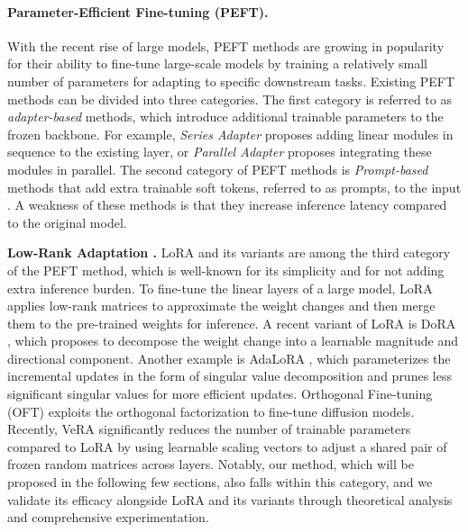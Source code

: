 \paragraph{Parameter-Efficient Fine-tuning (PEFT).} With the recent rise of large models, PEFT methods are growing in popularity for their ability to fine-tune large-scale models by training a relatively small number of parameters for adapting to specific downstream tasks. Existing PEFT methods can be divided into three categories. The first category is referred to as \textit{adapter-based} methods, which introduce additional trainable parameters to the frozen backbone. For example, \textit{Series Adapter} \cite{houlsby2019parameter} proposes adding linear modules in sequence to the existing layer, or \textit{Parallel Adapter} \cite{parallel-adapter} proposes integrating these modules in parallel. The second category of PEFT methods is \textit{Prompt-based} methods that add extra trainable soft tokens, referred to as prompts, to the input \cite{lester2021powerscaleparameterefficientprompt, razdaibiedina2023residualprompttuningimproving, wang2023nonintrusiveadaptationinputcentricparameterefficient}. A weakness of these methods is that they increase inference latency compared to the original model. 

\textbf{Low-Rank Adaptation \cite{lora}.}
LoRA and its variants are among the third category of the PEFT method, which is well-known for its simplicity and for not adding extra inference burden. To fine-tune the linear layers of a large model, LoRA applies low-rank matrices to approximate the weight changes and then merge them to the pre-trained weights for inference. A recent variant of LoRA is DoRA \cite{dora}, which proposes to decompose the weight change into a learnable magnitude and directional component. Another example is AdaLoRA \cite{adalora}, which parameterizes the incremental updates in the form of singular value decomposition and prunes less significant singular values for more efficient updates. Orthogonal Fine-tuning (OFT) \cite{oft} exploits the orthogonal factorization to fine-tune diffusion models. Recently, VeRA \cite{vera} significantly reduces the number of trainable parameters compared to LoRA by using learnable scaling vectors to adjust a shared pair of frozen random matrices across layers. Notably, our method, which will be proposed in the following few sections, also falls within this category, and we validate its efficacy alongside LoRA and its variants through theoretical analysis and comprehensive experimentation. 

